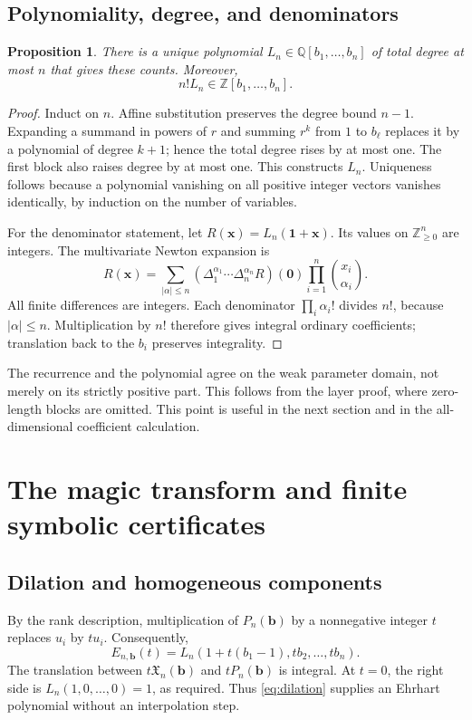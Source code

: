 \documentclass[11pt]{article}
\newtheorem{proposition}[theorem]{Proposition}
\theoremstyle{definition}
\newcommand{\Z}{\mathbb Z}
\newcommand{\Q}{\mathbb Q}
\newcommand{\bb}{\mathbf b}
\newcommand{\xx}{\mathbf x}
\newcommand{\one}{\mathbf 1}
\newcommand{\zero}{\mathbf 0}
\newcommand{\X}{\mathfrak X}
\numberwithin{equation}{section}
\begin{document}
\subsection{Polynomiality, degree, and denominators}
\begin{proposition}
\label{prop:polynomial}
There is a unique polynomial $L_n\in\Q[b_1,\ldots,b_n]$ of total degree at most
$n$ that gives these counts. Moreover,
\begin{equation}
 n!L_n\in\Z[b_1,\ldots,b_n].
 \label{eq:integral-scale}
\end{equation}
\end{proposition}
\begin{proof}
Induct on $n$. Affine substitution preserves the degree bound $n-1$.
Expanding a summand in powers of $r$ and summing $r^k$ from $1$ to $b_\ell$
replaces it by a polynomial of degree $k+1$; hence the total degree rises by
at most one. The first block also raises degree by at most one. This
constructs $L_n$. Uniqueness follows because a polynomial vanishing on all
positive integer vectors vanishes identically, by induction on the number
of variables.

For the denominator statement, let $R(\xx)=L_n(\one+\xx)$. Its values on
$\Z_{\ge0}^n$ are integers. The multivariate Newton expansion is
\[
 R(\xx)=\sum_{|\alpha|\le n}
 (\Delta_1^{\alpha_1}\cdots\Delta_n^{\alpha_n}R)(\zero)
 \prod_{i=1}^n\binom{x_i}{\alpha_i}.
\]
All finite differences are integers. Each denominator
$\prod_i\alpha_i!$ divides $n!$, because $|\alpha|\le n$.
Multiplication by $n!$ therefore gives integral ordinary coefficients;
translation back to the $b_i$ preserves integrality.
\end{proof}

The recurrence and the polynomial agree on the weak parameter domain,
not merely on its strictly positive part. This follows from the layer proof,
where zero-length blocks are omitted. This point is useful in the next section
and in the all-dimensional coefficient calculation.

\section{The magic transform and finite symbolic certificates}
\label{sec:certificates}

\subsection{Dilation and homogeneous components}
By the rank description, multiplication of $P_n(\bb)$ by a nonnegative
integer $t$ replaces $u_i$ by $t u_i$. Consequently,
\begin{equation}
 E_{n,\bb}(t)=L_n(1+t(b_1-1),t b_2,\ldots,t b_n).
 \label{eq:dilation}
\end{equation}
The translation between $t\X_n(\bb)$ and $tP_n(\bb)$ is integral.
At $t=0$, the right side is $L_n(1,0,\ldots,0)=1$, as required.
Thus \eqref{eq:dilation} supplies an Ehrhart polynomial without an
interpolation step.
\end{document}

